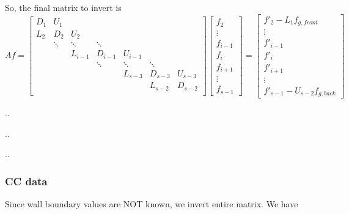 \documentclass[11pt]{article}
\begin{document}
So, the final matrix to invert is
\[ Af = \left[
\begin{array}{ccccccccc}
D_{1} & U_{1}    &           &           &           &           &         \\
L_{2} & D_{2}    & U_{2}     &           &           &           &         \\
      & \ddots   & \ddots    & \ddots    &           &           &         \\
      &          & L_{i-1}   & D_{i-1}   & U_{i-1}   &           &         \\
      &          &           & \ddots    & \ddots    & \ddots    &         \\
      &          &           &           & L_{s-3}   & D_{s-3}   & U_{s-3} \\
      &          &           &           &           & L_{s-2}   & D_{s-2} \\
\end{array} \right] 
\left[ \begin{array}{c}
f_{2} \\ \vdots \\ f_{i-1} \\ f_{i} \\ f_{i+1} \\ \vdots \\ f_{s-1}
\end{array} \right]
=
\left[ \begin{array}{c}
f'_{2} - L_1 f_{g,front} \\ \vdots \\ 
f'_{i-1} \\ f'_{i} \\ f'_{i+1} \\ \vdots \\ f'_{s-1} - U_{s-2} f_{g,back}
\end{array} \right]
\]

..

..

..

\subsubsection{CC data}

Since wall boundary values are NOT known, we invert entire matrix. We have
\end{document}
